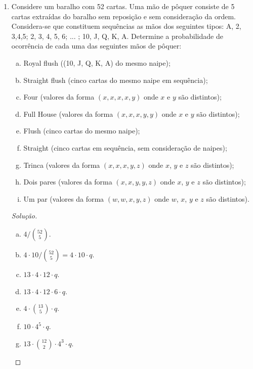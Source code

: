 \documentclass[../Notas.tex]{subfiles}
\begin{document}
\begin{enumerate}
    \begin{proof}[Solução]
        A probabilidade é
        \[
        \frac{\binom{r}{n-1}}{\binom{r+b}{n-1}}\cdot\frac{b}{r+b-n+1}.
        \]
    \end{proof}
    \item Considere um baralho com 52 cartas. Uma mão de pôquer consiste de 5 cartas extraídas do baralho sem reposição e sem consideração da ordem. Considera-se que constituem sequências as mãos dos seguintes tipos: A, 2, 3,4,5; 2, 3, 4, 5, 6; ... ; 10, J, Q, K, A. Determine a probabilidade de ocorrência de cada uma das seguintes mãos de pôquer:
    \begin{enumerate}[a)]
    \item Royal flush ((10, J, Q, K, A) do mesmo naipe);
    \item Straight flush (cinco cartas do mesmo naipe em sequência);
    \item Four (valores da forma $(x, x, x, x, y)$ onde $x$ e $y$ são distintos);
    \item Full House (valores da forma $(x, x, x, y, y)$ onde $x$ e $y$ são distintos);
    \item Flush (cinco cartas do mesmo naipe);
    \item Straight (cinco cartas em sequência, sem consideração de naipes);
    \item Trinca (valores da forma $(x, x, x, y, z)$ onde $x$, $y$ e $z$ são distintos);
    \item Dois pares (valores da forma $(x, x, y, y, z)$ onde $x$, $y$ e $z$ são distintos);
    \item Um par (valores da forma $(w, w, x, y, z)$ onde $w$, $x$, $y$ e $z$ são distintos).
    \end{enumerate}
    \begin{proof}[Solução]
        \begin{enumerate}[a)]
            \item $4/\binom{52}{5}$.
            \item $4\cdot 10/\binom{52}{5} = 4\cdot 10\cdot q$.
            \item $13\cdot 4\cdot 12\cdot q$.
            \item $13\cdot 4\cdot 12\cdot 6\cdot q$.
            \item $4\cdot\binom{13}{5}\cdot q$.
            \item $10\cdot 4^5\cdot q$.
            \item $13\cdot\binom{12}{2}\cdot 4^3\cdot q$.

\end{enumerate}
\end{proof}
\end{enumerate}
\end{document}
